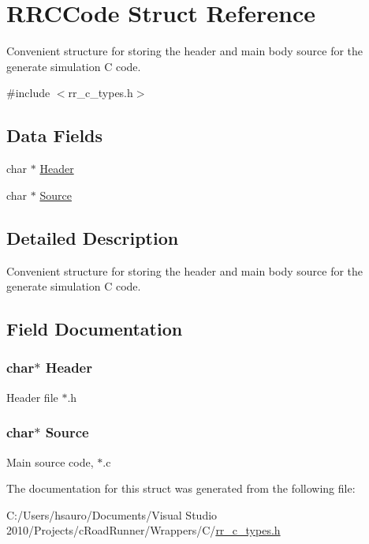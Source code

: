 \hypertarget{struct_r_r_c_code}{
\section{\-R\-R\-C\-Code \-Struct \-Reference}
\label{struct_r_r_c_code}
}


\-Convenient structure for storing the header and main body source for the generate simulation \-C code.  




{\ttfamily \#include $<$rr\-\_\-c\-\_\-types.\-h$>$}

\subsection*{\-Data \-Fields}
\begin{DoxyCompactItemize}
\item 
char $\ast$ \hyperlink{struct_r_r_c_code_a129503fa396e877e8400bb7cdc9774b5}{\-Header}
\item 
char $\ast$ \hyperlink{struct_r_r_c_code_a23fa2e731d8e1576c9095868b9651305}{\-Source}
\end{DoxyCompactItemize}


\subsection{\-Detailed \-Description}
\-Convenient structure for storing the header and main body source for the generate simulation \-C code. 

\subsection{\-Field \-Documentation}
\hypertarget{struct_r_r_c_code_a129503fa396e877e8400bb7cdc9774b5}{
\subsubsection[{\-Header}]{\setlength{\rightskip}{0pt plus 5cm}char$\ast$ {\bf \-Header}}}
\label{struct_r_r_c_code_a129503fa396e877e8400bb7cdc9774b5}
\-Header file $\ast$.h \hypertarget{struct_r_r_c_code_a23fa2e731d8e1576c9095868b9651305}{
\subsubsection[{\-Source}]{\setlength{\rightskip}{0pt plus 5cm}char$\ast$ {\bf \-Source}}}
\label{struct_r_r_c_code_a23fa2e731d8e1576c9095868b9651305}
\-Main source code, $\ast$.c 

\-The documentation for this struct was generated from the following file\-:\begin{DoxyCompactItemize}
\item 
\-C\-:/\-Users/hsauro/\-Documents/\-Visual Studio 2010/\-Projects/c\-Road\-Runner/\-Wrappers/\-C/\hyperlink{rr__c__types_8h}{rr\-\_\-c\-\_\-types.\-h}\end{DoxyCompactItemize}
